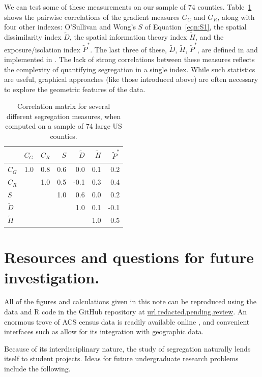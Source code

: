 \documentclass{article}
\theoremstyle{theorem}
\theoremstyle{definition}
\begin{document}
We can test some of these measurements on our sample of 74 counties. Table~\ref{tab:indexcor} shows the pairwise correlations of the gradient measures $G_C$ and $G_R$, along with four other indexes: O'Sullivan and Wong's $S$ of Equation~\ref{eqn:S1}, the spatial dissimilarity index $\tilde{D}$, the spatial information theory index $\tilde{H}$, and the exposure/isolation index $\tilde{P}^*$. The last three of these, $\tilde{D}$, $\tilde{H}$, $\tilde{P}^*$, are defined in \cite{reardonosullivan04} and implemented in \cite{hong14}. The lack of strong correlations between these measures reflects the complexity of quantifying segregation in a single index. While such statistics are useful, graphical approaches (like those introduced above) are often necessary to explore the geometric features of the data.

\begin{table}[bt]
\centering
\begin{tabular}{l|rrrrrr} %
   & $C_G$ & $C_R$ & $S$ & $\tilde{D}$ &  $\tilde{H}$ & $\tilde{P}^*$ \\
  \hline
  $C_G$ & 1.0 & 0.8 & 0.6 & 0.0 & 0.1 & 0.2 \\
  $C_R$ &  & 1.0 & 0.5 & -0.1 & 0.3 & 0.4 \\
  $S$ &  &  & 1.0 & 0.6 & 0.0 & 0.2 \\
  $\tilde{D}$ &  &  &  & 1.0 & 0.1 & -0.1 \\
  $\tilde{H}$ &  &  &  &  & 1.0 & 0.5 \\
\end{tabular}
\caption{Correlation matrix for several different segregation measures, when computed on a sample of 74 large US counties.}
\label{tab:indexcor}
\end{table}


\section{Resources and questions for future investigation.}

All of the figures and calculations given in this note can be reproduced using the data and R code in the GitHub repository at
\url{url.redacted.pending.review}. An enormous trove of ACS census data is readily available online \cite{acs19}, and convenient interfaces such as \cite{walker19} allow for its integration with geographic data.

Because of its interdisciplinary nature, the study of segregation naturally lends itself to student projects. Ideas for future undergraduate research problems include the following.
\end{document}

